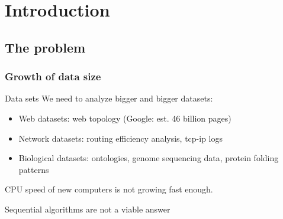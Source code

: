 \section{Introduction}
\subsection{The problem}
% 
% 
% 

\begin{frame}
 \frametitle{Growth of data size}
\begin{block}{Data sets}
 We need to analyze bigger and bigger datasets:
\begin{itemize}
 \item Web datasets: web topology (Google: est. 46 billion pages)
 \item Network datasets: routing efficiency analysis, tcp-ip logs
 \item Biological datasets: ontologies, genome sequencing data, protein folding patterns 
\end{itemize}

CPU speed of new computers is not growing fast enough.

Sequential algorithms are not a viable answer
\end{block}

\end{frame}

